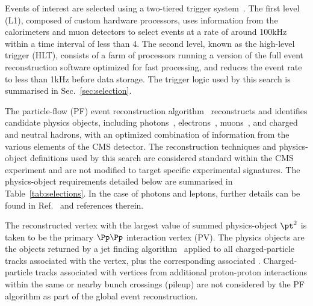 Events of interest are selected using a two-tiered trigger
system~\cite{Khachatryan:2016bia}. The first level (L1), composed of
custom hardware processors, uses information from the calorimeters and
muon detectors to select events at a rate of around 100\unit{kHz}
within a time interval of less than 4\mus. The second level, known as
the high-level trigger (HLT), consists of a farm of processors running
a version of the full event reconstruction software optimized for fast
processing, and reduces the event rate to less than 1\unit{kHz} before
data storage. The trigger logic used by this search is summarised in
Sec.~\ref{sec:selection}.

The particle-flow (PF) event reconstruction
algorithm~\cite{Sirunyan:2017ulk} reconstructs and identifies
candidate physics objects, including
photons~\cite{Khachatryan:2015iwa},
electrons~\cite{Khachatryan:2015hwa}, muons~\cite{Chatrchyan:2012xi},
and charged and neutral hadrons, with an optimized combination of
information from the various elements of the CMS detector. The
reconstruction techniques and physics-object definitions used by this
search are considered standard within the CMS experiment and are not
modified to target specific experimental signatures. The
physics-object requirements detailed below are summarised in
Table~\ref{tab:selections}. In the case of photons and leptons,
further details can be found in Ref.~\cite{Khachatryan:2016dvc} and
references therein. 

The reconstructed vertex with the largest value of summed
physics-object $\pt^2$ is taken to be the primary $\Pp\Pp$ interaction
vertex (PV). The physics objects are the objects returned by a jet
finding algorithm~\cite{Cacciari:2008gp, Cacciari:2011ma} applied to
all charged-particle tracks associated with the vertex, plus the
corresponding associated \ptmiss. Charged-particle tracks associated
with vertices from additional proton-proton interactions within the
same or nearby bunch crossings (pileup) are not considered by the PF
algorithm as part of the global event reconstruction.


